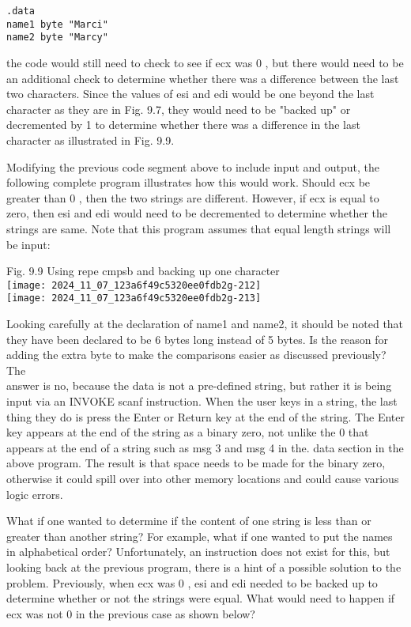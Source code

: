 \documentclass[10pt]{article}
\begin{document}
\begin{verbatim}
.data
name1 byte "Marci"
name2 byte "Marcy"
\end{verbatim}

the code would still need to check to see if ecx was 0 , but there would need to be an additional check to determine whether there was a difference between the last two characters. Since the values of esi and edi would be one beyond the last character as they are in Fig. 9.7, they would need to be "backed up" or decremented by 1 to determine whether there was a difference in the last character as illustrated in Fig. 9.9.

Modifying the previous code segment above to include input and output, the following complete program illustrates how this would work. Should ecx be greater than 0 , then the two strings are different. However, if ecx is equal to zero, then esi and edi would need to be decremented to determine whether the strings are same. Note that this program assumes that equal length strings will be input:

Fig. 9.9 Using repe cmpsb and backing up one character\\
\texttt{[image: 2024\_11\_07\_123a6f49c5320ee0fdb2g-212]}\\
\texttt{[image: 2024\_11\_07\_123a6f49c5320ee0fdb2g-213]}

Looking carefully at the declaration of name1 and name2, it should be noted that they have been declared to be 6 bytes long instead of 5 bytes. Is the reason for adding the extra byte to make the comparisons easier as discussed previously? The\\
answer is no, because the data is not a pre-defined string, but rather it is being input via an INVOKE scanf instruction. When the user keys in a string, the last thing they do is press the Enter or Return key at the end of the string. The Enter key appears at the end of the string as a binary zero, not unlike the 0 that appears at the end of a string such as msg 3 and msg 4 in the. data section in the above program. The result is that space needs to be made for the binary zero, otherwise it could spill over into other memory locations and could cause various logic errors.

What if one wanted to determine if the content of one string is less than or greater than another string? For example, what if one wanted to put the names in alphabetical order? Unfortunately, an instruction does not exist for this, but looking back at the previous program, there is a hint of a possible solution to the problem. Previously, when ecx was 0 , esi and edi needed to be backed up to determine whether or not the strings were equal. What would need to happen if ecx was not 0 in the previous case as shown below?
\end{document}
